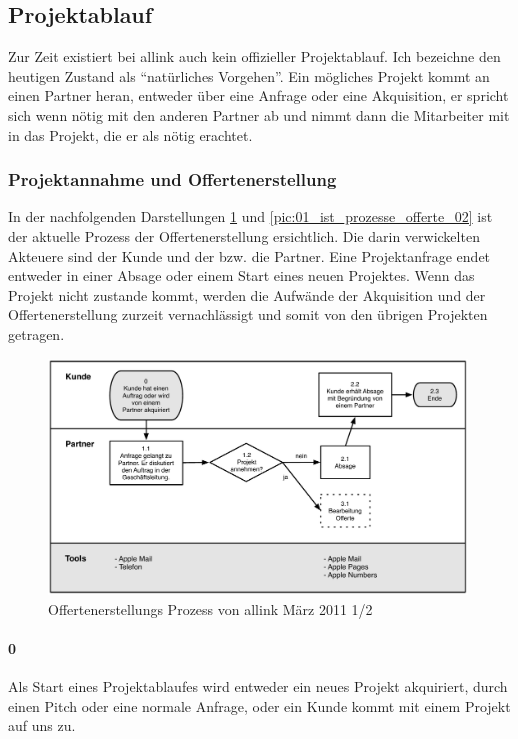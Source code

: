 \subsection{Projektablauf}
Zur Zeit existiert bei allink auch kein offizieller Projektablauf. Ich bezeichne
den heutigen Zustand als ``natürliches Vorgehen''. Ein mögliches Projekt
kommt an einen Partner heran, entweder über eine Anfrage oder eine Akquisition,
er spricht sich wenn nötig mit den anderen Partner ab und nimmt dann die
Mitarbeiter mit in das Projekt, die er als nötig erachtet.

\subsubsection{Projektannahme und Offertenerstellung}
In der nachfolgenden Darstellungen \ref{pic:01_ist_prozesse_offerte_01} und
\ref{pic:01_ist_prozesse_offerte_02} ist der
aktuelle Prozess der Offertenerstellung ersichtlich. Die darin verwickelten
Akteuere sind der Kunde und der bzw. die Partner.
Eine Projektanfrage endet entweder in einer Absage oder einem Start eines neuen 
Projektes. Wenn das Projekt nicht zustande kommt, werden die Aufwände der
Akquisition und der Offertenerstellung zurzeit vernachlässigt und somit von
den übrigen Projekten getragen.

\begin{figure}[htbp]
\begin{center}
\includegraphics[width=0.99\textwidth,angle=0]{./bilder/01_ist_prozesse_offerte_01.pdf}
\caption{Offertenerstellungs Prozess von allink März 2011 1/2}
\label{pic:01_ist_prozesse_offerte_01}
\end{center}
\end{figure}

\paragraph{0}
Als Start eines Projektablaufes wird entweder ein neues Projekt akquiriert, 
durch einen Pitch oder eine normale Anfrage, oder ein Kunde kommt mit einem
Projekt auf uns zu.


